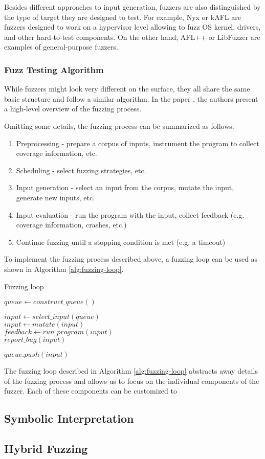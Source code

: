Besides different approaches to input generation, fuzzers are also distinguished by the type of target they are designed to test. For example, Nyx \cite{nyx-hypervisor-fuzzer-usenix21} or kAFL \cite{kafl-usenix17} are fuzzers designed to work on a hypervisor level allowing to fuzz OS kernel, drivers, and other hard-to-test components. On the other hand, AFL++ or LibFuzzer are examples of general-purpose fuzzers.

\subsubsection{Fuzz Testing Algorithm}

While fuzzers might look very different on the surface, they all share the same basic structure and follow a similar algorithm. In the paper \cite{the-art-science-and-engineering-of-fuzzing-a-survey}, the authors present a high-level overview of the fuzzing process.

Omitting some details, the fuzzing process can be summarized as follows:

\begin{enumerate}
    \item Preprocessing - prepare a corpus of inputs, instrument the program to collect coverage information, etc.
    \item Scheduling - select fuzzing strategies, etc.
    \item Input generation - select an input from the corpus, mutate the input, generate new inputs, etc.
    \item Input evaluation - run the program with the input, collect feedback (e.g. coverage information, crashes, etc.)
    \item Continue fuzzing until a stopping condition is met (e.g. a timeout)
\end{enumerate}

To implement the fuzzing process described above, a fuzzing loop can be used as shown in Algorithm \ref{alg:fuzzing-loop}.

\begin{algorithm}
    \caption{Fuzzing loop}
    \label{alg:fuzzing-loop}
    $queue \gets construct\_queue()$ \\
     {
        $input \gets select\_input(queue)$ \\
        $input \gets mutate(input)$ \\
        $feedback \gets run\_program(input)$ \\
         {
            $report\_bug(input)$ \\
        }

         {
            $queue.push(input)$ \\
        }
    }
\end{algorithm}

The fuzzing loop described in Algorithm \ref{alg:fuzzing-loop} abstracts away details of the fuzzing process and allows us to focus on the individual components of the fuzzer. Each of these components can be customized to

\subsection{Symbolic Interpretation}

\subsection{Hybrid Fuzzing}
